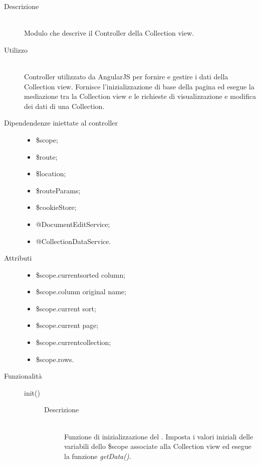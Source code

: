 \begin{description}
 \item[Descrizione] \hfill \\
 Modulo che descrive il Controller della Collection view.
 
 \item[Utilizzo] \hfill \\
 Controller utilizzato da AngularJS per fornire e gestire i dati della Collection view.
 Fornisce l'inizializzazione di base della pagina ed esegue la mediazione tra la Collection view
 e le richieste di visualizzazione e modifica dei dati di una Collection.
 
 \item[Dipendendenze iniettate al controller] \hfill
 \begin{itemize}
  \item \$scope;
  \item \$route;
  \item \$location;
  \item \$routeParams;
  \item \$cookieStore;
  \item @DocumentEditService;
  \item @CollectionDataService.
 \end{itemize}
 
 \item[Attributi] \hfill
 \begin{itemize}
 \item \$scope.current\textunderscore sorted \textunderscore column;
 \item \$scope.column \textunderscore original \textunderscore name;
 \item \$scope.current \textunderscore sort;
 \item \$scope.current \textunderscore page;
 \item \$scope.current\textunderscore collection;
 \item \$scope.rows.
 \end{itemize}
 
 \item[Funzionalità] \hfill
 \begin{description}
  \item[init()] \hfill
  	\begin{description}
  		\item[Descrizione] \hfill \\
  Funzione di inizializzazione del . Imposta i valori iniziali delle variabili dello
  \$scope associate alla Collection view ed esegue la funzione \textit{getData()}.
  	\end{description}
  	

\end{description}
\end{description}
